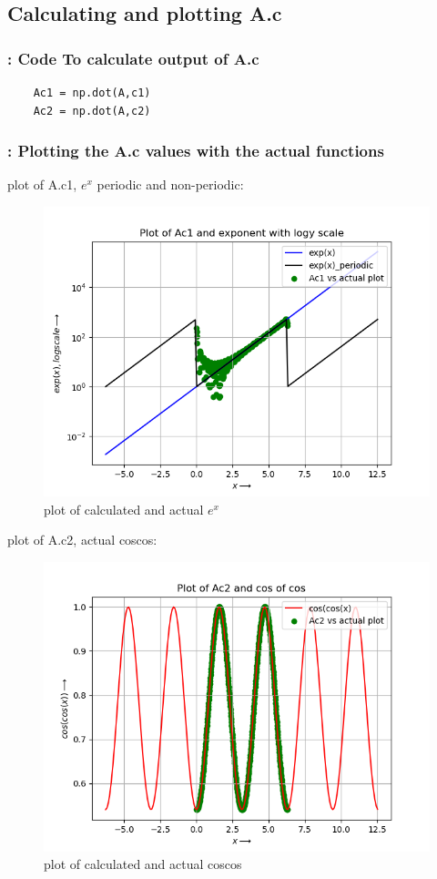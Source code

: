 \documentclass[11pt]{article}
\begin{document}
\subsection{Calculating and plotting A.c}

\subsubsection{: Code To calculate output of A.c}
\begin{verbatim}
    Ac1 = np.dot(A,c1)
    Ac2 = np.dot(A,c2)
\end{verbatim}

\subsubsection{: Plotting the A.c values with the actual functions}

plot of A.c1, $e^{x}$ periodic and non-periodic:
\begin{figure}[H]
    \centering
    \includegraphics[scale = 0.5]{Figure_15.png}
    \caption{plot of calculated and actual $e^{x}$}
\end{figure}

plot of A.c2, actual coscos:
\begin{figure}[H]
    \centering
    \includegraphics[scale = 0.5]{Figure_16.png}
    \caption{plot of calculated and actual coscos}
\end{figure}
\end{document}
